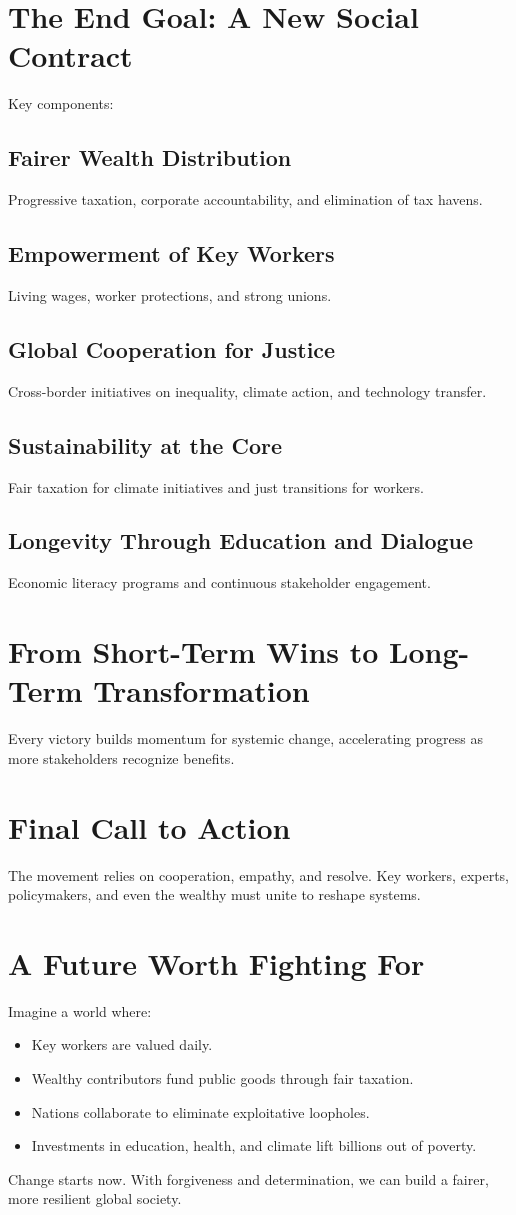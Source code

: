 \documentclass[11pt,a4paper]{article}
\begin{document}
\section{The End Goal: A New Social Contract}
Key components:
\subsection{Fairer Wealth Distribution}
Progressive taxation, corporate accountability, and elimination of tax havens.

\subsection{Empowerment of Key Workers}
Living wages, worker protections, and strong unions.

\subsection{Global Cooperation for Justice}
Cross-border initiatives on inequality, climate action, and technology transfer.

\subsection{Sustainability at the Core}
Fair taxation for climate initiatives and just transitions for workers.

\subsection{Longevity Through Education and Dialogue}
Economic literacy programs and continuous stakeholder engagement.

\section{From Short-Term Wins to Long-Term Transformation}
Every victory builds momentum for systemic change, accelerating progress as more stakeholders recognize benefits.

\section{Final Call to Action}
The movement relies on cooperation, empathy, and resolve. Key workers, experts, policymakers, and even the wealthy must unite to reshape systems.

\section{A Future Worth Fighting For}
Imagine a world where:
\begin{itemize}
  \item Key workers are valued daily.
  \item Wealthy contributors fund public goods through fair taxation.
  \item Nations collaborate to eliminate exploitative loopholes.
  \item Investments in education, health, and climate lift billions out of poverty.
\end{itemize}

Change starts now. With forgiveness and determination, we can build a fairer, more resilient global society.
\end{document}
